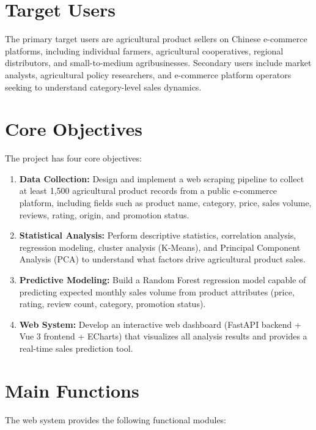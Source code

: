 \documentclass[12pt,a4paper]{report}
\begin{document}
\section{Target Users}

The primary target users are agricultural product sellers on Chinese e-commerce platforms, including individual farmers, agricultural cooperatives, regional distributors, and small-to-medium agribusinesses. Secondary users include market analysts, agricultural policy researchers, and e-commerce platform operators seeking to understand category-level sales dynamics.

\section{Core Objectives}

The project has four core objectives:

\begin{enumerate}[itemsep=4pt]
  \item \textbf{Data Collection:} Design and implement a web scraping pipeline to collect at least 1,500 agricultural product records from a public e-commerce platform, including fields such as product name, category, price, sales volume, reviews, rating, origin, and promotion status.
  \item \textbf{Statistical Analysis:} Perform descriptive statistics, correlation analysis, regression modeling, cluster analysis (K-Means), and Principal Component Analysis (PCA) to understand what factors drive agricultural product sales.
  \item \textbf{Predictive Modeling:} Build a Random Forest regression model capable of predicting expected monthly sales volume from product attributes (price, rating, review count, category, promotion status).
  \item \textbf{Web System:} Develop an interactive web dashboard (FastAPI backend + Vue 3 frontend + ECharts) that visualizes all analysis results and provides a real-time sales prediction tool.
\end{enumerate}

\section{Main Functions}

The web system provides the following functional modules:
\end{document}
